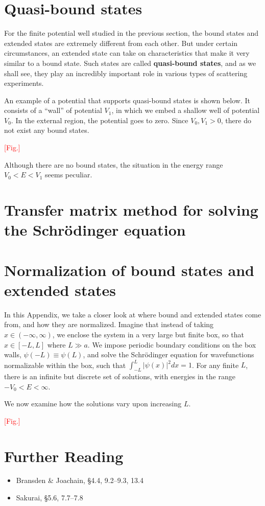 \documentclass[pra,11pt]{revtex4}
\begin{document}
\section{Quasi-bound states}

For the finite potential well studied in the previous section, the
bound states and extended states are extremely different from each
other.  But under certain circumstances, an extended state can take on
characteristics that make it very similar to a bound state.  Such
states are called \textbf{quasi-bound states}, and as we shall see,
they play an incredibly important role in various types of scattering
experiments.

An example of a potential that supports quasi-bound states is shown
below.  It consists of a ``wall'' of potential $V_1$, in which we
embed a shallow well of potential $V_0$.  In the external region, the
potential goes to zero.  Since $V_0, V_1 > 0$, there do not exist any
bound states.

\textcolor{red}{[Fig.]}

Although there are no bound states, the situation in the energy range
$V_0 < E < V_1$ seems peculiar.






\appendix
\section{Transfer matrix method for solving the Schr\"odinger equation}


\section{Normalization of bound states and extended states}

In this Appendix, we take a closer look at where bound and extended
states come from, and how they are normalized.  Imagine that instead
of taking $x \in (-\infty,\infty)$, we enclose the system in a very
large but finite box, so that $x \in [-L,L]$ where $L \gg a$.  We
impose periodic boundary conditions on the box walls, $\psi(-L) \equiv
\psi(L)$, and solve the Schr\"odinger equation for wavefunctions
normalizable within the box, such that $\int_{-L}^{L} |\psi(x)|^2 dx =
1$.  For any finite $L$, there is an infinite but discrete set of
solutions, with energies in the range $-V_0 <E < \infty$.

We now examine how the solutions vary upon increasing $L$.

\textcolor{red}{[Fig.]}





\section{Further Reading}

\begin{itemize}
\item Bransden \& Joachain, \S4.4, 9.2--9.3, 13.4
\item Sakurai, \S5.6, 7.7--7.8

\end{itemize}
\end{document}
